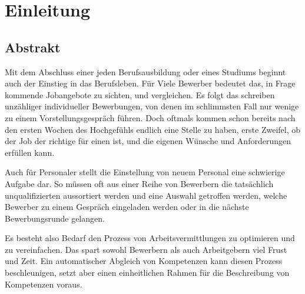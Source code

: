 \section{Einleitung}\label{1_einleitung}

\subsection{Abstrakt}
Mit dem Abschluss einer jeden Berufsausbildung oder eines Studiums beginnt auch der Einstieg in das Berufsleben. Für Viele Bewerber bedeutet das, in Frage kommende Jobangebote zu sichten, und vergleichen. Es folgt das schreiben unzähliger individueller Bewerbungen, von denen im schlimmsten Fall nur wenige zu einem Vorstellungsgespräch führen. Doch oftmals kommen schon bereits nach den ersten Wochen des Hochgefühls endlich eine Stelle zu haben, erste Zweifel, ob der Job der richtige für einen ist, und die eigenen Wünsche und Anforderungen erfüllen kann. \newline

Auch für Personaler stellt die Einstellung von neuem Personal eine schwierige Aufgabe dar. So müssen oft aus einer Reihe von Bewerbern die tatsächlich unqualifizierten aussortiert werden und eine Auswahl getroffen werden, welche Bewerber zu einem Gespräch eingeladen werden oder in die nächste Bewerbungsrunde gelangen.
 
Es besteht also Bedarf den Prozess von Arbeitsvermittlungen zu optimieren und zu vereinfachen. Das spart sowohl Bewerbern als auch Arbeitgebern viel Frust und Zeit. Ein automatischer Abgleich von Kompetenzen kann diesen Prozess beschleunigen, setzt aber einen einheitlichen Rahmen für die Beschreibung von Kompetenzen voraus. \newline
% 
%
%

